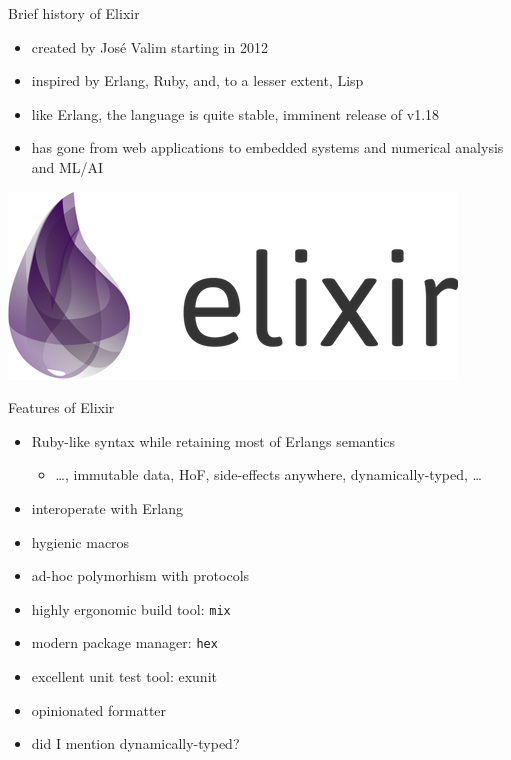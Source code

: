 \documentclass[
  ignorenonframetext,
  aspectratio=169]{beamer}
\newcommand{\passthrough}[1]{#1}
\providecommand{\tightlist}{%
  \setlength{\itemsep}{0pt}\setlength{\parskip}{0pt}}
\begin{document}
\begin{frame}{Brief history of Elixir}
\label{brief-history-of-elixir}
\begin{itemize}
\tightlist
\item
  created by José Valim starting in 2012
\item
  inspired by Erlang, Ruby, and, to a lesser extent, Lisp
\item
  like Erlang, the language is quite stable, imminent release of v1.18
\item
  has gone from web applications to embedded systems and numerical
  analysis and ML/AI
\end{itemize}

\begin{center}
\includegraphics[width=.5\textwidth]{./img/elixir_logo.png}
\end{center}
\end{frame}

\begin{frame}[fragile]{Features of Elixir}
\label{features-of-elixir}
\begin{itemize}
\tightlist
\item
  Ruby-like syntax while retaining most of Erlang\textquotesingle s
  semantics

  \begin{itemize}
  \tightlist
  \item
    \ldots, immutable data, HoF, side-effects anywhere,
    dynamically-typed, \ldots{}
  \end{itemize}
\item
  interoperate with Erlang
\item
  hygienic macros
\item
  ad-hoc polymorhism with protocols
\item
  highly ergonomic build tool: \passthrough{\lstinline!mix!}
\item
  modern package manager: \passthrough{\lstinline!hex!}
\item
  excellent unit test tool: exunit
\item
  opinionated formatter
\item
  did I mention dynamically-typed?
\end{itemize}
\end{frame}
\end{document}
